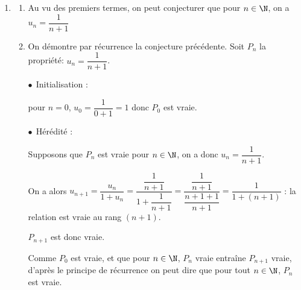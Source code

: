 \begin{enumerate}
On résout l'équation: $\dfrac{\ell}{1+\ell}= \ell \iff \ell = \ell(1 + \ell) \iff 0= \ell ^2 \iff \ell = 0$.

Donc la suite $(u_n)$ a pour limite 0.

\item 
	\begin{enumerate}
		\item 
Au vu des premiers termes, on peut conjecturer que pour $n \in \N$, on a $u_n = \dfrac{1}{n+1}$
				
		\item On démontre par récurrence la conjecture précédente.
Soit $P_n$ la propriété: $u_n=\dfrac{1}{n+1}$.
		
$\bullet~~$Initialisation :
		
pour $n=0$, $u_0=\dfrac{1}{0+1}=1$ donc $P_0$ est vraie.

$\bullet~~$Hérédité : 
		
Supposons que $P_n$ est vraie pour $n \in \N$, on a donc $u_n=\dfrac{1}{n+1}$.
		
On a alors $u_{n+1}=\dfrac{u_n}{1+u_n}=\dfrac{\dfrac{1}{n+1}}{1+\dfrac{1}{n+1}}=\dfrac{\dfrac{1}{n+1}}{\dfrac{n+1+1}{n+1}}=\dfrac{1}{1+(n+1)}$ : la relation est vraie au rang $(n + 1)$.

$P_{n+1}$ est donc vraie.
		
Comme $P_0$ est vraie, et que pour $n \in \N$,\: $P_n$ vraie entraîne $P_{n+1}$ vraie, d'après le principe de récurrence  on peut dire que pour tout $n \in \N$, $P_n$ est vraie.
	\end{enumerate}
\end{enumerate}

\vspace{1cm}
